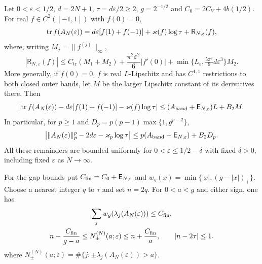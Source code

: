 \begin{corollary}
\label{v7:cor:finite-law}\label{v10:cor:finite-band-schatten}
\label{v10:cor:finite-gap-plateau}\label{rem:finite-counts}
Let $0<\varepsilon<1/2$, $d=2N+1$, $\tau=d\varepsilon/2\ge2$,
$g=2^{-1/2}$ and $C_0=2C_V+4b(1/2)$.
For real $f\in C^2([-1,1])$ with $f(0)=0$,
\begin{equation}\label{v7:eq:finite-law}
 \operatorname{tr} f(A_N(\varepsilon))
 =d\varepsilon[f(1)+f(-1)]+\varkappa(f)\log\tau
       +\mathsf R_{N,\varepsilon}(f),
\end{equation}
where, writing $M_j=\|f^{(j)}\|_\infty$,
\[
 |\mathsf R_{N,\varepsilon}(f)|
 \le C_{\mathrm{tr}}(M_1+M_2)
       +\frac{\pi^2\varepsilon^2}{6}|f'(0)|
       +\min\{L_\varepsilon,\tfrac{5\pi^2}{9}d\varepsilon^3\}M_2.
\]
More generally, if $f(0)=0$, $f$ is real $L$-Lipschitz and has
$C^{1,1}$ restrictions to both closed outer bands, let $M$ be the
larger Lipschitz constant of its derivatives there. Then
\begin{equation}\label{v10:eq:finite-band-law}
 \left|\operatorname{tr} f(A_N(\varepsilon))
   -d\varepsilon[f(1)+f(-1)]-\varkappa(f)\log\tau\right|
 \le(A_{\rm band}+\mathsf E_{N,\varepsilon})L+B_2M.
\end{equation}
In particular, for $p\ge1$ and
$D_p=p(p-1)\max\{1,g^{p-2}\}$,
\begin{equation}\label{v10:eq:finite-schatten-law}
 \left|\|A_N(\varepsilon)\|_p^p
       -2d\varepsilon-\varkappa_p\log\tau\right|
 \le p(A_{\rm band}+\mathsf E_{N,\varepsilon})+B_2D_p.
\end{equation}
All these remainders are bounded uniformly for
$0<\varepsilon\le1/2-\delta$ with fixed $\delta>0$, including fixed
$\varepsilon$ as $N\to\infty$.

For the gap bounds put $C_{\rm fin}=C_0+\mathsf E_{N,\varepsilon}$ and
$w_g(x)=\min\{|x|,(g-|x|)_+\}$. Choose a nearest integer $q$ to $\tau$
and set $n=2q$. For $0<a<g$ and either sign, one has
\[
 \begin{gathered}
 \sum_j w_g(\lambda_j(A_N(\varepsilon)))\le C_{\rm fin},\\
 n-\frac{C_{\rm fin}}{g-a}
 \le N^{(N)}_\pm(a;\varepsilon)
 \le n+\frac{C_{\rm fin}}a,\qquad |n-2\tau|\le1.
 \end{gathered}
\]
where $N^{(N)}_\pm(a;\varepsilon)=
\#\{j:\pm\lambda_j(A_N(\varepsilon))>a\}$.
\end{corollary}
